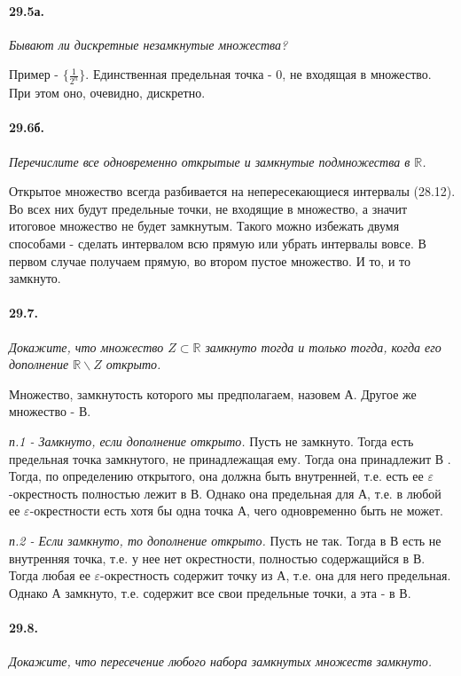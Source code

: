 \documentclass{book}
\begin{document}
\paragraph{29.5а.}
\textit{Бывают ли дискретные незамкнутые множества?}

Пример - $\{\frac{1}{2^n}\}$. Единственная предельная точка - 0, не входящая в множество. При этом оно, очевидно, дискретно.

\paragraph{29.6б.}
\textit{Перечислите все одновременно открытые и замкнутые подмножества в $\mathbb{R}$.}

Открытое множество всегда разбивается на непересекающиеся интервалы (28.12). Во всех них будут предельные точки, не входящие в множество, а значит итоговое множество не будет замкнутым. Такого можно избежать двумя способами - сделать интервалом всю прямую или убрать интервалы вовсе. В первом случае получаем прямую, во втором пустое множество. И то, и то замкнуто. 

\paragraph{29.7.}
\textit{Докажите, что множество $Z \subset \mathbb{R}$ замкнуто тогда и только тогда, когда его дополнение $\mathbb{R} \backslash Z$ открыто.}

Множество, замкнутость которого мы предполагаем, назовем А. Другое же множество - В.

\textit{п.1 - Замкнуто, если дополнение открыто.} Пусть не замкнуто. Тогда есть предельная точка замкнутого, не принадлежащая ему. Тогда она принадлежит В . Тогда, по определению открытого, она должна быть внутренней, т.е. есть ее $\varepsilon$-окрестность полностью лежит в В. Однако она предельная для А, т.е. в любой ее $\varepsilon$-окрестности есть хотя бы одна точка А, чего одновременно быть не может.

\textit{п.2 - Если замкнуто, то дополнение открыто.} Пусть не так. Тогда в В есть не внутренняя точка, т.е. у нее нет окрестности, полностью содержащийся в В. Тогда любая ее $\varepsilon$-окрестность содержит точку из А, т.е. она для него предельная. Однако А замкнуто, т.е. содержит все свои предельные точки, а эта - в В.

\paragraph{29.8.}
\textit{Докажите, что пересечение любого набора замкнутых множеств замкнуто.}
\end{document}
